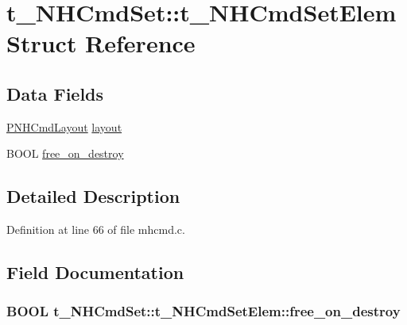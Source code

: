 \hypertarget{structt__NHCmdSet_1_1t__NHCmdSetElem}{\section{t\+\_\+\+N\+H\+Cmd\+Set\+:\+:t\+\_\+\+N\+H\+Cmd\+Set\+Elem Struct Reference}
\label{structt__NHCmdSet_1_1t__NHCmdSetElem}
}
\subsection*{Data Fields}
\begin{DoxyCompactItemize}
\item 
\hyperlink{mhcmd_8c_aaff26e9507b2c94d8428960902cbaeb4}{P\+N\+H\+Cmd\+Layout} \hyperlink{structt__NHCmdSet_1_1t__NHCmdSetElem_aea1a472ac29d2338226972e53b82a463}{layout}
\item 
B\+O\+O\+L \hyperlink{structt__NHCmdSet_1_1t__NHCmdSetElem_a6a68706040fcf42bc48b881d1cb47597}{free\+\_\+on\+\_\+destroy}
\end{DoxyCompactItemize}


\subsection{Detailed Description}


Definition at line 66 of file mhcmd.\+c.



\subsection{Field Documentation}
\hypertarget{structt__NHCmdSet_1_1t__NHCmdSetElem_a6a68706040fcf42bc48b881d1cb47597}{
\subsubsection[{free\+\_\+on\+\_\+destroy}]{\setlength{\rightskip}{0pt plus 5cm}B\+O\+O\+L t\+\_\+\+N\+H\+Cmd\+Set\+::t\+\_\+\+N\+H\+Cmd\+Set\+Elem\+::free\+\_\+on\+\_\+destroy}}\label{structt__NHCmdSet_1_1t__NHCmdSetElem_a6a68706040fcf42bc48b881d1cb47597}


